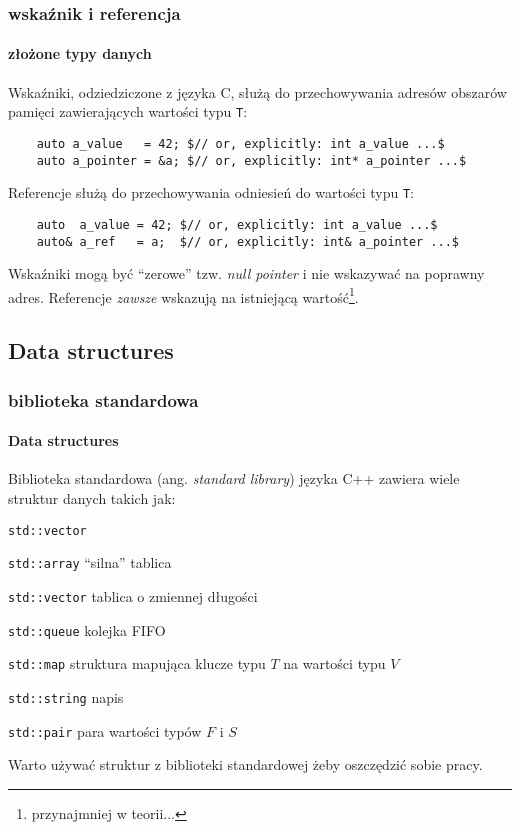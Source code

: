 \documentclass[aspectratio=169]{beamer}
\begin{document}
\begin{frame}[fragile]
    \frametitle{wskaźnik i referencja}
    \framesubtitle{złożone typy danych}

    Wskaźniki, odziedziczone z języka C, służą do przechowywania adresów
    obszarów pamięci zawierających wartości typu {\tt T}:
    {\footnotesize \begin{lstlisting}
    auto a_value   = 42; $// or, explicitly: int a_value ...$
    auto a_pointer = &a; $// or, explicitly: int* a_pointer ...$
    \end{lstlisting}}

    Referencje służą do przechowywania odniesień do wartości typu {\tt T}:
    {\footnotesize \begin{lstlisting}
    auto  a_value = 42; $// or, explicitly: int a_value ...$
    auto& a_ref   = a;  $// or, explicitly: int& a_pointer ...$
    \end{lstlisting}}

    Wskaźniki mogą być ``zerowe'' tzw. \emph{null pointer} i nie wskazywać na
    poprawny adres. Referencje \emph{zawsze} wskazują na istniejącą
    wartość\footnote{przynajmniej w teorii...}.
\end{frame}

\subsection{Data structures}

\begin{frame}
    \frametitle{biblioteka standardowa}
    \framesubtitle{Data structures}

    Biblioteka standardowa (ang. \emph{standard library}) języka C++ zawiera
    wiele struktur danych takich jak:

    \begin{labeling}{{\tt std::vector}}
    \item[{\tt std::array}] ``silna'' tablica
    \item[{\tt std::vector}] tablica o zmiennej długości
    \item[{\tt std::queue}] kolejka FIFO
    \item[{\tt std::map}] struktura mapująca klucze typu $T$ na wartości typu $V$
    \item[{\tt std::string}] napis
    \item[{\tt std::pair}] para wartości typów $F$ i $S$
    \end{labeling}

    \vspace{1em}

    Warto używać struktur z biblioteki standardowej żeby oszczędzić sobie pracy.
\end{frame}
\end{document}
